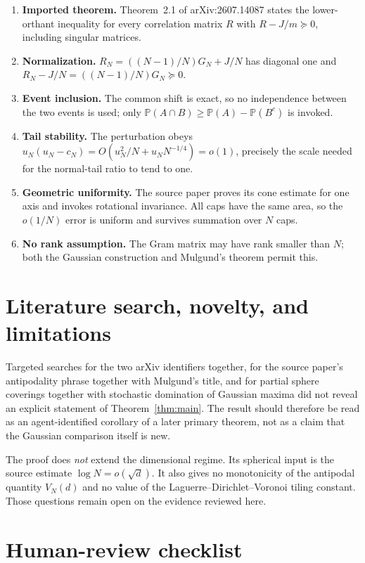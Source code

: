 \documentclass[11pt]{article}
\newcommand{\PP}{\mathbb P}
\begin{document}
\begin{enumerate}[leftmargin=*]
\item \textbf{Imported theorem.} Theorem~2.1 of arXiv:2607.14087 states the
lower-orthant inequality for every correlation matrix $R$ with
$R-J/m\succeq0$, including singular matrices.
\item \textbf{Normalization.} $R_N=((N-1)/N)G_N+J/N$ has diagonal one and
$R_N-J/N=((N-1)/N)G_N\succeq0$.
\item \textbf{Event inclusion.} The common shift is exact, so no independence
between the two events is used; only
$\PP(A\cap B)\ge\PP(A)-\PP(B^c)$ is invoked.
\item \textbf{Tail stability.} The perturbation obeys
$u_N(u_N-c_N)=O(u_N^2/N+u_NN^{-1/4})=o(1)$, precisely the scale needed for
the normal-tail ratio to tend to one.
\item \textbf{Geometric uniformity.} The source paper proves its cone estimate
for one axis and invokes rotational invariance.  All caps have the same area,
so the $o(1/N)$ error is uniform and survives summation over $N$ caps.
\item \textbf{No rank assumption.} The Gram matrix may have rank smaller than
$N$; both the Gaussian construction and Mulgund's theorem permit this.
\end{enumerate}

\section{Literature search, novelty, and limitations}

Targeted searches for the two arXiv identifiers together, for the source
paper's antipodality phrase together with Mulgund's title, and for partial
sphere coverings together with stochastic domination of Gaussian maxima did
not reveal an explicit statement of Theorem~\ref{thm:main}.  The result should
therefore be read as an agent-identified corollary of a later primary theorem,
not as a claim that the Gaussian comparison itself is new.

The proof does \emph{not} extend the dimensional regime.  Its spherical
input is the source estimate $\log N=o(\sqrt d)$.  It also gives no monotonicity
of the antipodal quantity $V_N(d)$ and no value of the
Laguerre--Dirichlet--Voronoi tiling constant.  Those questions remain open on
the evidence reviewed here.

\section{Human-review checklist}
\end{document}
